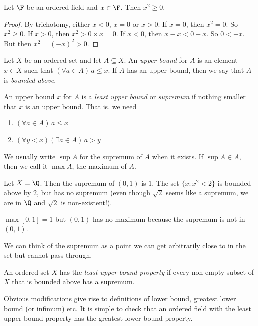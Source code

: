 \documentclass[a4paper]{article}
\begin{document}
\begin{lemma}
  Let $\F$ be an ordered field and $x\in \F$. Then $x^2 \geq 0$.
\end{lemma}

\begin{proof}
  By trichotomy, either $x < 0$, $x = 0$ or $x > 0$. If $x = 0$, then $x^2 = 0$. So $x^2 \geq 0$. If $x > 0$, then $x^2 > 0\times x = 0$. If $x < 0$, then $x - x < 0 - x$. So $0 < -x$. But then $x^2 = (-x)^2 > 0$.
\end{proof}

\begin{defi}
  Let $X$ be an ordered set and let $A\subseteq X$. An \emph{upper bound} for $A$ is an element $x\in X$ such that $(\forall a\in A)\,a \leq x$. If $A$ has an upper bound, then we say that $A$ is \emph{bounded above}.

  An upper bound $x$ for $A$ is a \emph{least upper bound} or \emph{supremum} if nothing smaller that $x$ is an upper bound. That is, we need
  \begin{enumerate}
    \item $(\forall a\in A)\,a \leq x$
    \item $(\forall y < x)(\exists a\in A)\,a > y$
  \end{enumerate}

  We usually write $\sup A$ for the supremum of $A$ when it exists. If $\sup A\in A$, then we call it $\max A$, the maximum of $A$.
\end{defi}

\begin{eg}
  Let $X = \Q$. Then the supremum of $(0, 1)$ is $1$. The set $\{x: x^2 < 2\}$ is bounded above by $2$, but has no supremum (even though $\sqrt{2}$ seems like a supremum, we are in $\Q$ and $\sqrt{2}$ is non-existent!).

  $\max [0, 1] = 1$ but $(0, 1)$ has no maximum because the supremum is not in $(0, 1)$.
\end{eg}

We can think of the supremum as a point we can get arbitrarily close to in the set but cannot pass through.

\begin{defi}
  An ordered set $X$ has the \emph{least upper bound property} if every non-empty subset of $X$ that is bounded above has a supremum.
\end{defi}

Obvious modifications give rise to definitions of lower bound, greatest lower bound (or infimum) etc. It is simple to check that an ordered field with the least upper bound property has the greatest lower bound property.
\end{document}
